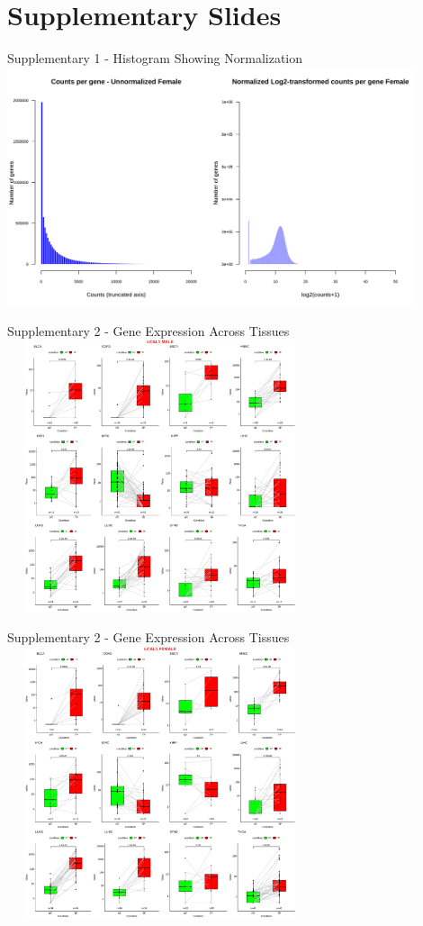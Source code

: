 \documentclass{beamer}
\begin{document}
	\section{Supplementary Slides}
	\begin{frame}{Supplementary 1 - Histogram Showing Normalization}
		\includegraphics[width=12cm, height=7cm]{all_cancers-F_before_and_after_normalization_hist.png}
	\end{frame}

	\begin{frame}{Supplementary 2 - Gene Expression Across Tissues}
		\centering \includegraphics[width=9cm, height=8cm]{all_cancerspairedboxplot_cancertype_0.9_lcal1male.png}
	\end{frame}

	\begin{frame}{Supplementary 2 - Gene Expression Across Tissues}
		\centering \includegraphics[width=9cm, height=8cm]{all_cancerspairedboxplot_cancertype_0.9_lcal1female.png}
	\end{frame}
	
\end{document}

